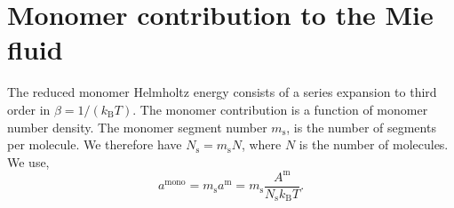 \documentclass[english]{../thermomemo/thermomemo}
\newcommand*{\pd}[3][]{\frac{\partial^{#1}#2}{\partial{#3}^{#1}}}%
\newcommand*{\pdc}[3]{\frac{\partial^{2}#1}{\partial{#2}\partial{#3}}}%
\newcommand*{\pdcc}[3]{\frac{\partial^{3}#1}{\partial{#2}^{2}\partial{#3}}}%
\newcommand*{\lb}{\left(}
\newcommand*{\rb}{\right)}
\newcommand{\hs}{\text{HS}\xspace}
\newcommand{\mono}{\ensuremath{\text{mono}}\xspace}
\newcommand{\ms}{\ensuremath{\text{m}}\xspace}
\newcommand{\seg}{\ensuremath{\text{s}}\xspace}
\newcommand{\kB}{\ensuremath{k_{\text{B}}}\xspace}
\newcommand{\at}{\ensuremath{\tilde{a}}\xspace}
\begin{document}

\section{Monomer contribution to the Mie fluid}
The reduced monomer Helmholtz energy consists of a series expansion to
third order in $\beta = 1/(\kB T)$. The monomer contribution is a
function of monomer number density. The monomer segment number
$m_\seg$, is the number of segments per molecule. We therefore have
$N_\seg = m_\seg N$, where $N$ is the number of molecules. We use,
\begin{equation}
  \label{eq:helm_mono}
  a^\mono = m_\seg a^\ms = m_\seg \frac{A^\ms}{N_\seg \kB T}.
\end{equation}
\end{document}
